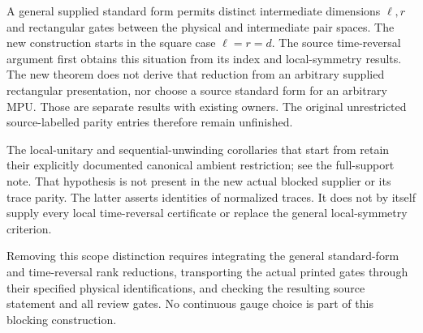\documentclass{article}
\begin{document}
A general supplied standard form permits distinct intermediate dimensions
$\ell,r$ and rectangular gates between the physical and intermediate pair
spaces. The new construction starts in the square case $\ell=r=d$.
The source time-reversal argument first obtains this situation from its
index and local-symmetry results. The new theorem does not derive that
reduction from an arbitrary supplied rectangular presentation, nor choose
a source standard form for an arbitrary MPU. Those are separate results
with existing owners. The original unrestricted source-labelled parity
entries therefore remain unfinished.

The local-unitary and sequential-unwinding corollaries that start from
 retain their explicitly documented
canonical ambient restriction; see the full-support note. That hypothesis
is not present in the new actual blocked supplier or its trace parity.
The latter asserts identities of normalized traces. It does not by itself
supply every local time-reversal certificate or replace the general
local-symmetry criterion.

Removing this scope distinction requires integrating the general
standard-form and time-reversal rank reductions, transporting the actual
printed gates through their specified physical identifications, and
checking the resulting source statement and all review gates. No
continuous gauge choice is part of this blocking construction.



\end{document}
